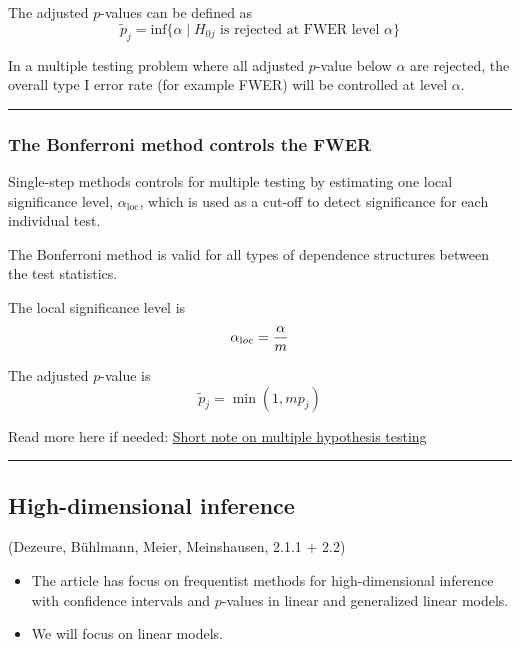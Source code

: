 \documentclass[
  letterpaper,
  DIV=11,
  numbers=noendperiod]{scrartcl}
\providecommand{\tightlist}{%
  \setlength{\itemsep}{0pt}\setlength{\parskip}{0pt}}\usepackage{longtable,booktabs,array}
\begin{document}
The adjusted \(p\)-values can be defined as
\[\tilde{p}_j = \text{inf}\{\alpha  \mid H_{0j}\text{ is rejected at FWER level } \alpha \}\]

In a multiple testing problem where all adjusted \(p\)-value below
\(\alpha\) are rejected, the overall type I error rate (for example
FWER) will be controlled at level \(\alpha\).

\begin{center}\rule{0.5\linewidth}{0.5pt}\end{center}

\hypertarget{the-bonferroni-method-controls-the-fwer}{%
\subsubsection{The Bonferroni method controls the
FWER}\label{the-bonferroni-method-controls-the-fwer}}

Single-step methods controls for multiple testing by estimating one
local significance level, \(\alpha_{\text{loc}}\), which is used as a
cut-off to detect significance for each individual test.

The Bonferroni method is valid for all types of dependence structures
between the test statistics.

The local significance level is \[\alpha_{\text loc}=\frac{\alpha}{m}\]

The adjusted \(p\)-value is \[ \tilde{p}_j =\min(1,m p_j)\]

Read more here if needed:
\href{https://www.math.ntnu.no/emner/TMA4267/2017v/multtest.pdf}{Short
note on multiple hypothesis testing}

\begin{center}\rule{0.5\linewidth}{0.5pt}\end{center}

\hypertarget{high-dimensional-inference}{%
\subsection{High-dimensional
inference}\label{high-dimensional-inference}}

(Dezeure, Bühlmann, Meier, Meinshausen, 2.1.1 + 2.2)

\begin{itemize}
\tightlist
\item
  The article has focus on frequentist methods for high-dimensional
  inference with confidence intervals and \(p\)-values in linear and
  generalized linear models.
\item
  We will focus on linear models.
\end{itemize}
\end{document}
